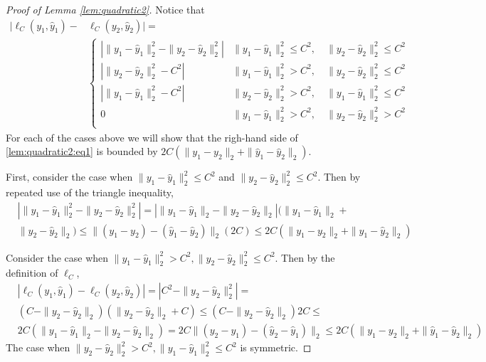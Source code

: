 \documentclass{article}
\begin{document}
\begin{proof}[Proof of Lemma \ref{lem:quadratic2}]
  Notice that
\begin{equation}
  \label{lem:quadratic2:eq1}
  \begin{aligned}
   |\ell_C(y_1, \hat{y}_1) - & \ell_C(y_2, \hat{y}_2)|=  \\
   & \left \{  
    \begin{array}{ll}
    |\|y_1-\hat{y}_1\|_2^2 - \|y_2-\hat{y}_2\|_2^2| & \|y_1-\hat{y}_1\|_2^2\leq C^2, \quad \|y_2-\hat{y}_2\|_2^2 \le C^2 \\
    |\|y_2 - \hat{y}_2\|_2^2 - C^2| & \|y_1-\hat{y}_1\|_2^2 > C^2, \quad  \|y_2-\hat{y}_2\|_2^2 \le C^2 \\
    |\|y_1 - \hat{y}_1\|_2^2 - C^2| & \|y_2-\hat{y}_2\|_2^2 > C^2, \quad \|y_1-\hat{y}_1\|_2^2 \le C^2 \\
    0  & \|y_1-\hat{y}_1\|_2^2 > C^2, \quad  \|y_2-\hat{y}_2\|_2^2 > C^2 \\ 
    \end{array}
   \right.
  \end{aligned}
\end{equation}
 For each of the cases above we will show that the righ-hand side of 
 \eqref{lem:quadratic2:eq1} is bounded by $2C (\|y_1-y_2\|_2+\|\hat{y}_1-\hat{y}_2\|_2)$.

 First, consider the case when $\|y_1-\hat{y}_1\|_2^2\leq C^2$ and $\|y_2-\hat{y}_2\|_2^2 \le C^2$.
 Then by repeated use of the triangle inequality,
 \begin{align*}
 & |\|y_1-\hat{y}_1\|_2^2 - \|y_2-\hat{y}_2\|_2^2|= 
 |\|y_1-\hat{y}_1\|_2 - \|y_2-\hat{y}_2\|_2|(\|y_1-\hat{y}_1\|_2 + \\
 & \|y_2-\hat{y}_2\|_2) \le \|(y_1-y_2)-(\hat{y}_1-\hat{y}_2)\|_2 (2C) \le 
 2C (\|y_1-y_2\|_2+\|\hat{y}_1-\hat{y}_2\|_2)
 \end{align*}

  Consider the case when $\|y_1-\hat{y}_1\|_2^2 > C^2, \|y_2-\hat{y}_2\|_2^2 \le C^2$.
  Then by the definition of $\ell_C$,
   \begin{align*}
 &  |\ell_C(y_1, \hat{y}_1) - \ell_C(y_2, \hat{y}_2)| = |C^2 - \|y_2-\hat{y}_2\|_2^2| = \\
  & (C - \|y_2-\hat{y}_2\|_2 )(\|y_2-\hat{y}_2\|_2 + C) \le (C-\|y_2-\hat{y}_2\|_2) 2C  \le \\
  &  2C (\|y_1-\hat{y}_1\|_2-\|y_2-\hat{y}_2\|_2)=
  2C\|(y_2-y_1)-(\hat{y}_2-\hat{y}_1)\|_2 \le
  2C (\|y_1-y_2\|_2+\|\hat{y}_1-\hat{y}_2\|_2)
  \end{align*}
  The case when $\|y_2-\hat{y}_2\|_2^2 > C^2, \|y_1-\hat{y}_1\|_2^2 \le C^2$ is symmetric.


\end{proof}
\end{document}
